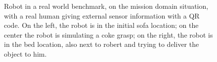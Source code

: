 \begin{figure}[H]
        \caption{Robot in a real world benchmark, on the mission domain
        situation, with a real human giving external sensor information with a
        QR code. On the left, the robot is in the initial sofa location; on the center
        the robot is simulating a coke grasp; on the right, the robot is in the bed location,
        also next to robert and trying to deliver the object to him.}
        \label{fig:real_world_test_wander}
\end{figure}

